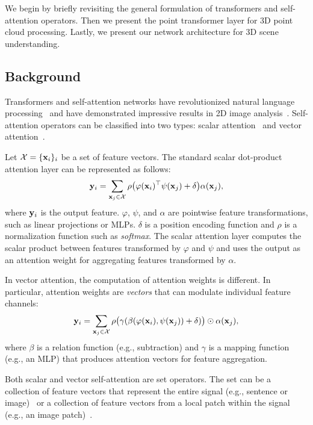 \vspace{-2pt}
We begin by briefly revisiting the general formulation of transformers and self-attention operators. Then we present the point transformer layer for 3D point cloud processing. Lastly, we present our network architecture for 3D scene understanding.

\subsection{Background}
Transformers and self-attention networks have revolutionized natural language processing~\cite{vaswani2017attention,wu2019pay,Devlin2018,dai2019transformer,Yang2019xlnet} and have demonstrated impressive results in 2D image analysis~\cite{hu2019local,ramachandran2019stand,zhao2020san,dosovitskiy2021image}. Self-attention operators can be classified into two types: scalar attention~\cite{vaswani2017attention} and vector attention~\cite{zhao2020san}.

Let $\mathcal{X} = \{\mathbf{x}_i\}_i$ be a set of feature vectors. The standard scalar dot-product attention layer can be represented as follows:
\begin{equation}\label{eq:scalar}
\mathbf{y}_{i} = \sum_{\mathbf{x}_j \in \mathcal{X}} \rho\big(\varphi(\mathbf{x}_i)^\top \psi(\mathbf{x}_j) + \delta\big) \alpha(\mathbf{x}_{j}),
\end{equation}
where $\mathbf{y}_{i}$ is the output feature. $\varphi$, $\psi$, and $\alpha$ are pointwise feature transformations, such as linear projections or MLPs. $\delta$ is a position encoding function and $\rho$ is a normalization function such as \textit{softmax}. The scalar attention layer computes the scalar product between features transformed by $\varphi$ and $\psi$ and uses the output as an attention weight for aggregating features transformed by $\alpha$.

In vector attention, the computation of attention weights is different. In particular, attention weights are \emph{vectors} that can modulate individual feature channels:
\begin{equation}\label{eq:vector}
\mathbf{y}_{i} = \sum_{\mathbf{x}_j \in \mathcal{X}} \rho\big(\gamma(\beta(\varphi(\mathbf{x}_i), \psi(\mathbf{x}_j))+\delta)\big) \odot \alpha(\mathbf{x}_{j}),
\end{equation}
where $\beta$ is a relation function (e.g., subtraction) and $\gamma$ is a mapping function (e.g., an MLP) that produces attention vectors for feature aggregation.

Both scalar and vector self-attention are set operators. The set can be a collection of feature vectors that represent the entire signal (e.g., sentence or image)~\cite{vaswani2017attention,dosovitskiy2021image} or a collection of feature vectors from a local patch within the signal (e.g., an image patch)~\cite{hu2019local,ramachandran2019stand,zhao2020san}.

